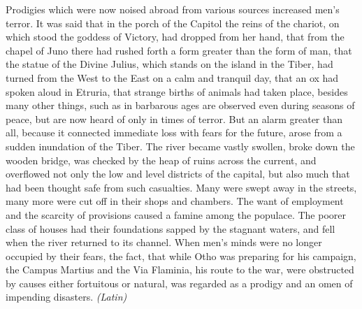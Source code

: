 Prodigies which were now noised abroad from various sources increased men's terror. It was said that in the porch of the Capitol the reins of the chariot, on which stood the goddess of Victory, had dropped from her hand, that from the chapel of Juno there had rushed forth a form greater than the form of man, that the statue of the Divine Julius, which stands on the island in the Tiber, had turned from the West to the East on a calm and tranquil day, that an ox had spoken aloud in Etruria, that strange births of animals had taken place, besides many other things, such as in barbarous ages are observed even during seasons of peace, but are now heard of only in times of terror. But an alarm greater than all, because it connected immediate loss with fears for the future, arose from a sudden inundation of the Tiber. The river became vastly swollen, broke down the wooden bridge, was checked by the heap of ruins across the current, and overflowed not only the low and level districts of the capital, but also much that had been thought safe from such casualties. Many were swept away in the streets, many more were cut off in their shops and chambers. The want of employment and the scarcity of provisions caused a famine among the populace. The poorer class of houses had their foundations sapped by the stagnant waters, and fell when the river returned to its channel. When men's minds were no longer occupied by their fears, the fact, that while Otho was preparing for his campaign, the Campus Martius and the Via Flaminia, his route to the war, were obstructed by causes either fortuitous or natural, was regarded as a prodigy and an omen of impending disasters. \emph{(Latin)}


